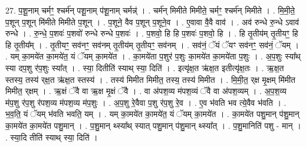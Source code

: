 \documentclass[17pt]{extarticle}
\begin{document}
27. प॒शू॒नाम् चर्मꣳ॒॒ श्चर्म॑न् पशू॒नाम् प॑शू॒नाम् चर्मन्न्॑ । . चर्म॑न् मिमीते मिमीते॒ चर्मꣳ॒॒ श्चर्म॑न् मिमीते । . मि॒मी॒ते॒ प॒शून् प॒शून् मि॑मीते मिमीते प॒शून् । . प॒शूने॒ वैव प॒शून् प॒शूने॒व । . ए॒वावा वै॒वै वाव॑ । . अव॑ रुन्धे रु॒न्धे ऽवाव॑ रुन्धे । . रु॒न्धे॒ प॒शवः॑ प॒शवो॑ रुन्धे रुन्धे प॒शवः॑ । . प॒शवो॒ हि हि प॒शवः॑ प॒शवो॒ हि । . हि तृ॒तीय॑म् तृ॒तीयꣳ॒॒ हि हि तृ॒तीय᳚म् । . तृ॒तीयꣳ॒॒ सव॑नꣳ॒॒ सव॑नम् तृ॒तीय॑म् तृ॒तीयꣳ॒॒ सव॑नम् । . सव॑नं॒ ॅयं ॅयꣳ सव॑नꣳ॒॒ सव॑नं॒ ॅयम् । . यम् का॒मये॑त का॒मये॑त॒ यं ॅयम् का॒मये॑त । . का॒मये॑ता प॒शुर॑ प॒शुः का॒मये॑त का॒मये॑ता प॒शुः । . अ॒प॒शुः स्या᳚थ् स्या दप॒शु र॑प॒शुः स्या᳚त् । . स्या॒ दितीति॑ स्याथ् स्या॒ दिति॑ । . इत्यृ॑क्ष॒त ऋ॑क्ष॒त इतीत्यृ॑क्ष॒तः । . ऋ॒क्ष॒त स्तस्य॒ तस्य॑ र्‌क्ष॒त ऋ॑क्ष॒त स्तस्य॑ । . तस्य॑ मिमीत मिमीत॒ तस्य॒ तस्य॑ मिमीत । . मि॒मी॒त॒ र्‌क्ष मृ॒क्षम् मि॑मीत मिमीत॒ र्‌क्षम् । . ऋ॒क्षं ॅवै वा ऋ॒क्ष मृ॒क्षं ॅवै । . वा अ॑पश॒व्य म॑पश॒व्यं ॅवै वा अ॑पश॒व्यम् । . अ॒प॒श॒व्य म॑प॒शु र॑प॒शु र॑पश॒व्य म॑पश॒व्य म॑प॒शुः । . अ॒प॒शु रे॒वैवा प॒शु र॑प॒शु रे॒व । . ए॒व भ॑वति भव त्ये॒वैव भ॑वति । . भ॒व॒ति॒ यं ॅयम् भ॑वति भवति॒ यम् । . यम् का॒मये॑त का॒मये॑त॒ यं ॅयम् का॒मये॑त । . का॒मये॑त पशु॒मान् प॑शु॒मान् का॒मये॑त का॒मये॑त पशु॒मान् । . प॒शु॒मान् थ्स्या᳚थ् स्यात् पशु॒मान् प॑शु॒मान् थ्स्या᳚त् । . प॒शु॒मानिति॑ पशु - मान् । . स्या॒दि तीति॑ स्याथ् स्या॒ दिति॑ । \newline
\end{document}

